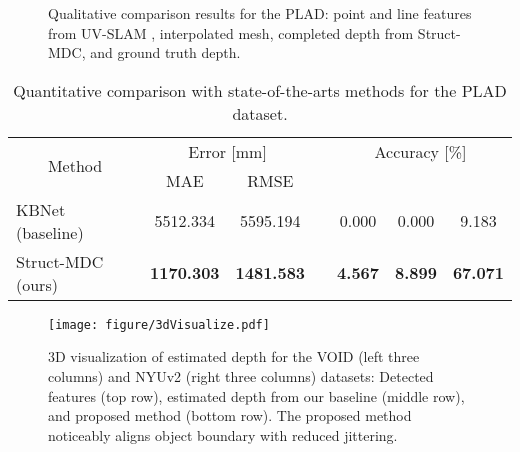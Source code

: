 \begin{figure}[t]
    \centering
    \caption{Qualitative comparison results for the PLAD: 
     point and line features from UV-SLAM \cite{uvslsam}, 
     interpolated mesh, 
     completed depth from Struct-MDC, and 
     ground truth depth.}\label{fig:plad_result}
    \vspace{-0.3cm}
\end{figure}
\begin{table}[!t]
\centering
\renewcommand{\arraystretch}{1.10} \renewcommand{\tabcolsep}{1.0mm}  \caption{Quantitative comparison with state-of-the-art\textcolor{color1}{s methods} for the PLAD \textcolor{color1}{dataset}.
}
\begin{tabular}{lcccccc}
\hline
\multicolumn{1}{c}{\multirow{2}{*}{Method}} & \multicolumn{2}{c}{Error {[}mm{]} } &  & \multicolumn{3}{c}{Accuracy {[}\%{]} }  \\ \cline{2-3} \cline{5-7} 
\multicolumn{1}{c}{}                        & MAE                    & RMSE                   &  &      &      &       \\ \hline
\textcolor{color2}{KBNet (baseline)~\cite{baseline}}                            & 5512.334               & 5595.194               &  &  0.000 &  0.000 & 9.183           \\
Struct-MDC (ours)                                        & \textbf{1170.303}      & \textbf{1481.583}      &  & \textbf{4.567} & \textbf{8.899} & \textbf{67.071} \\ \hline
\end{tabular}
\label{table:exp_plad}
\end{table}



\begin{figure*}[th!]
\centering
    \texttt{[image: figure/3dVisualize.pdf]}
    \caption{3D visualization of estimated depth for the VOID (left three columns) and NYUv2 (right three columns) \textcolor{color1}{datasets}: Detected features (top row), estimated depth from our baseline (middle row), and proposed method (bottom row). The proposed method \textcolor{color1}{noticeably} aligns object boundary with reduced jittering.} 
    \label{fig:3d_visualize}
    \vspace{-0.4cm}
\end{figure*} 







